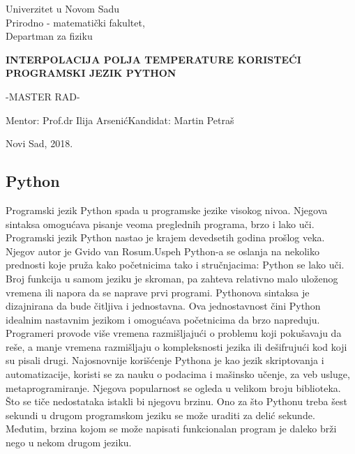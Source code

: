 \documentclass[12pt]{article}
\begin{document}
\begin{center}
{\Large Univerzitet u Novom Sadu\\\Large Prirodno - matematički fakultet,\\ \Large Departman za fiziku}
\end {center}
\begin{center}
\vspace{3.cm}
{\Large  \textbf{INTERPOLACIJA POLJA TEMPERATURE KORISTEĆI PROGRAMSKI JEZIK PYTHON}}
\end {center}
\vspace{1.cm}
\begin{center}
\Large -MASTER RAD-
\end{center}
\vspace{3cm}
\begin{center}Mentor: Prof.dr Ilija Arsenić\hfill Kandidat: Martin Petraš
\end{center}
\vspace{0.5cm}
\begin{center}
Novi Sad, 2018.
\end{center}
\newpage
\pagebreak
\begin{center}
\tableofcontents
\end{center}
\newpage
\pagebreak
{}
\begin{center}
\section*{Python}
\end{center}
\begin{center}
Programski jezik Python spada u programske jezike visokog nivoa. Njegova sintaksa omogućava pisanje veoma preglednih programa, brzo i lako uči. Programski jezik Python nastao je krajem devedsetih godina prošlog veka. Njegov autor je Gvido van Rosum.Uspeh Python-a se oslanja na nekoliko prednosti koje pruža kako početnicima tako i stručnjacima: Python se lako uči. Broj funkcija u samom jeziku je skroman, pa zahteva relativno malo uloženog vremena ili napora da se naprave prvi programi. Pythonova sintaksa je dizajnirana da bude čitljiva i jednostavna. Ova jednostavnost čini Python idealnim nastavnim jezikom i omogućava početnicima da brzo napreduju. Programeri provode više vremena razmišljajući o problemu koji pokušavaju da reše, a manje vremena razmišljaju o kompleksnosti jezika ili dešifrujući kod koji su pisali drugi. 
Najosnovnije korišćenje Pythona je kao jezik skriptovanja i automatizacije, koristi se za nauku o podacima i mašinsko učenje, za veb usluge, metaprogramiranje. Njegova popularnost se ogleda u velikom broju biblioteka. Što se tiče nedostataka istakli bi njegovu brzinu. Ono za što Pythonu treba šest sekundi u drugom programskom jeziku se može uraditi za delić sekunde. Međutim, brzina kojom se može napisati funkcionalan program je daleko brži nego u nekom drugom jeziku.  
\end{center}
\end{document}
